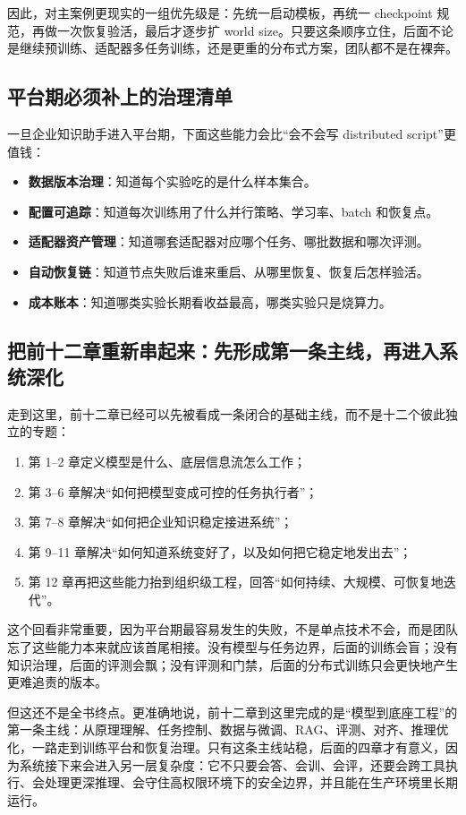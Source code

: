 因此，对主案例更现实的一组优先级是：先统一启动模板，再统一 checkpoint 规范，再做一次恢复验活，最后才逐步扩 world size。只要这条顺序立住，后面不论是继续预训练、适配器多任务训练，还是更重的分布式方案，团队都不是在裸奔。

\subsection{平台期必须补上的治理清单}
一旦企业知识助手进入平台期，下面这些能力会比“会不会写 distributed script”更值钱：
\begin{itemize}
  \item \textbf{数据版本治理}：知道每个实验吃的是什么样本集合。
  \item \textbf{配置可追踪}：知道每次训练用了什么并行策略、学习率、batch 和恢复点。
  \item \textbf{适配器资产管理}：知道哪套适配器对应哪个任务、哪批数据和哪次评测。
  \item \textbf{自动恢复链}：知道节点失败后谁来重启、从哪里恢复、恢复后怎样验活。
  \item \textbf{成本账本}：知道哪类实验长期看收益最高，哪类实验只是烧算力。
\end{itemize}

\subsection{把前十二章重新串起来：先形成第一条主线，再进入系统深化}
走到这里，前十二章已经可以先被看成一条闭合的基础主线，而不是十二个彼此独立的专题：
\begin{enumerate}
  \item 第 1--2 章定义模型是什么、底层信息流怎么工作；
  \item 第 3--6 章解决“如何把模型变成可控的任务执行者”；
  \item 第 7--8 章解决“如何把企业知识稳定接进系统”；
  \item 第 9--11 章解决“如何知道系统变好了，以及如何把它稳定地发出去”；
  \item 第 12 章再把这些能力抬到组织级工程，回答“如何持续、大规模、可恢复地迭代”。
\end{enumerate}

这个回看非常重要，因为平台期最容易发生的失败，不是单点技术不会，而是团队忘了这些能力本来就应该首尾相接。没有模型与任务边界，后面的训练会盲；没有知识治理，后面的评测会飘；没有评测和门禁，后面的分布式训练只会更快地产生更难追责的版本。

但这还不是全书终点。更准确地说，前十二章到这里完成的是“模型到底座工程”的第一条主线：从原理理解、任务控制、数据与微调、RAG、评测、对齐、推理优化，一路走到训练平台和恢复治理。只有这条主线站稳，后面的四章才有意义，因为系统接下来会进入另一层复杂度：它不只要会答、会训、会评，还要会跨工具执行、会处理更深推理、会守住高权限环境下的安全边界，并且能在生产环境里长期运行。

